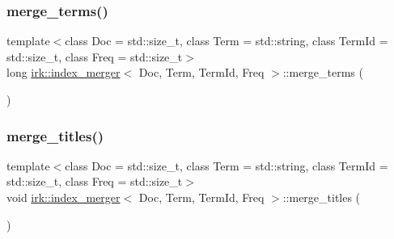 \subsubsection{\texorpdfstring{merge\+\_\+terms()}{merge\_terms()}}
{\footnotesize\ttfamily template$<$class Doc = std\+::size\+\_\+t, class Term = std\+::string, class Term\+Id = std\+::size\+\_\+t, class Freq = std\+::size\+\_\+t$>$ \\
long \mbox{\hyperlink{classirk_1_1index__merger}{irk\+::index\+\_\+merger}}$<$ Doc, Term, Term\+Id, Freq $>$\+::merge\+\_\+terms (\begin{DoxyParamCaption}{ }\end{DoxyParamCaption})\hspace{0.3cm}{\ttfamily [inline]}}

\mbox{\label{classirk_1_1index__merger_a82a8c5def4100f2cd1be63a037a3a570}} 
\subsubsection{\texorpdfstring{merge\+\_\+titles()}{merge\_titles()}}
{\footnotesize\ttfamily template$<$class Doc = std\+::size\+\_\+t, class Term = std\+::string, class Term\+Id = std\+::size\+\_\+t, class Freq = std\+::size\+\_\+t$>$ \\
void \mbox{\hyperlink{classirk_1_1index__merger}{irk\+::index\+\_\+merger}}$<$ Doc, Term, Term\+Id, Freq $>$\+::merge\+\_\+titles (\begin{DoxyParamCaption}{ }\end{DoxyParamCaption})\hspace{0.3cm}{\ttfamily [inline]}}

\mbox{\label{classirk_1_1index__merger_a22098d0868dcb779ce43540a60b724ab}} 
